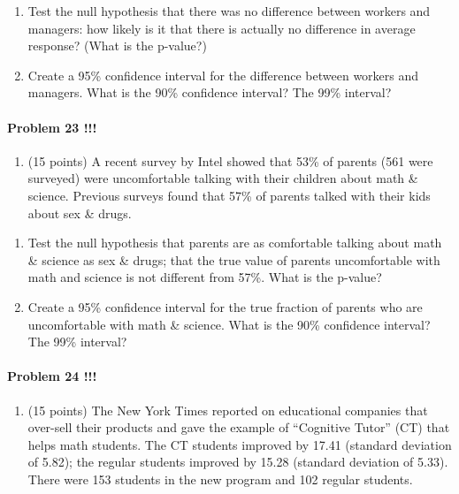 \documentclass[]{article}
\providecommand{\tightlist}{%
  \setlength{\itemsep}{0pt}\setlength{\parskip}{0pt}}
\let\oldparagraph\paragraph
\renewcommand{\paragraph}[1]{\oldparagraph{#1}\mbox{}}
\begin{document}
\begin{enumerate}
\def\labelenumi{\alph{enumi}.}
\setcounter{enumi}{3}
\tightlist
\item
  Test the null hypothesis that there was no difference between workers
  and managers: how likely is it that there is actually no difference in
  average response? (What is the p-value?)
\item
  Create a 95\% confidence interval for the difference between workers
  and managers. What is the 90\% confidence interval? The 99\% interval?
\end{enumerate}

\paragraph{Problem 23 !!!}\label{problem-23}

\begin{enumerate}
\def\labelenumi{\arabic{enumi}.}
\setcounter{enumi}{27}
\tightlist
\item
  (15 points) A recent survey by Intel showed that 53\% of parents (561
  were surveyed) were uncomfortable talking with their children about
  math \& science. Previous surveys found that 57\% of parents talked
  with their kids about sex \& drugs.
\end{enumerate}

\begin{enumerate}
\def\labelenumi{\alph{enumi}.}
\tightlist
\item
  Test the null hypothesis that parents are as comfortable talking about
  math \& science as sex \& drugs; that the true value of parents
  uncomfortable with math and science is not different from 57\%. What
  is the p-value?
\item
  Create a 95\% confidence interval for the true fraction of parents who
  are uncomfortable with math \& science. What is the 90\% confidence
  interval? The 99\% interval?
\end{enumerate}

\paragraph{Problem 24 !!!}\label{problem-24}

\begin{enumerate}
\def\labelenumi{\arabic{enumi}.}
\setcounter{enumi}{28}
\tightlist
\item
  (15 points) The New York Times reported on educational companies that
  over-sell their products and gave the example of ``Cognitive Tutor''
  (CT) that helps math students. The CT students improved by 17.41
  (standard deviation of 5.82); the regular students improved by 15.28
  (standard deviation of 5.33). There were 153 students in the new
  program and 102 regular students.
\end{enumerate}
\end{document}
